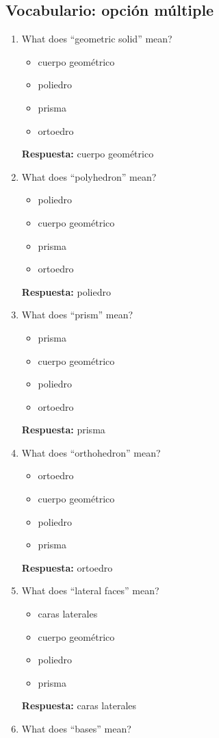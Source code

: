 \documentclass[11pt,a4paper]{article}
\begin{document}
\subsection{Vocabulario: opci\'on m\'ultiple}
\begin{enumerate}
\item What does ``geometric solid'' mean?
\begin{itemize}
\item cuerpo geométrico
\item poliedro
\item prisma
\item ortoedro
\end{itemize}
\textbf{Respuesta:} cuerpo geométrico
\item What does ``polyhedron'' mean?
\begin{itemize}
\item poliedro
\item cuerpo geométrico
\item prisma
\item ortoedro
\end{itemize}
\textbf{Respuesta:} poliedro
\item What does ``prism'' mean?
\begin{itemize}
\item prisma
\item cuerpo geométrico
\item poliedro
\item ortoedro
\end{itemize}
\textbf{Respuesta:} prisma
\item What does ``orthohedron'' mean?
\begin{itemize}
\item ortoedro
\item cuerpo geométrico
\item poliedro
\item prisma
\end{itemize}
\textbf{Respuesta:} ortoedro
\item What does ``lateral faces'' mean?
\begin{itemize}
\item caras laterales
\item cuerpo geométrico
\item poliedro
\item prisma
\end{itemize}
\textbf{Respuesta:} caras laterales
\item What does ``bases'' mean?
\begin{itemize}

\end{itemize}
\end{enumerate}
\end{document}
